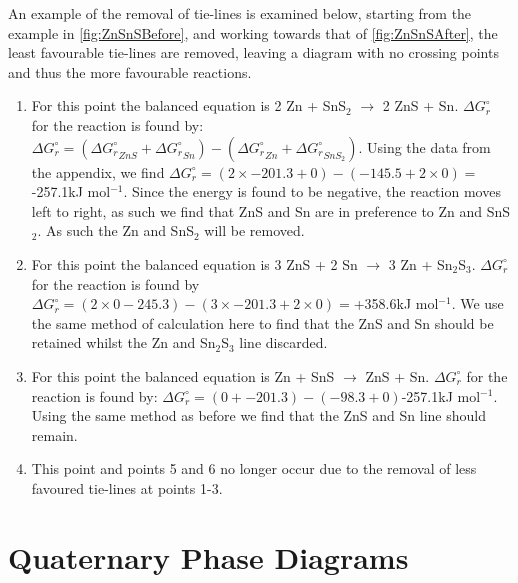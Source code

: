 An example of the removal of tie-lines is examined below, starting from the example in \ref{fig:ZnSnSBefore}, and working towards that of \ref{fig:ZnSnSAfter}, the least favourable tie-lines are removed, leaving a diagram with no crossing points and thus the more favourable reactions.

\begin{enumerate}
\item For this point the balanced equation is 2 Zn + SnS$_2$ $\rightarrow$ 2 ZnS + Sn. $\Delta G_{r}^{\circ}$ for the reaction is found by: $\Delta G_{r}^{\circ} = (\Delta {G_{r}^{\circ}}_{ZnS} + \Delta {G_{r}^{\circ}}_{Sn}) - (\Delta {G_{r}^{\circ}}_{Zn} + \Delta {G_{r}^{\circ}}_{SnS_2})$. Using the data from the appendix, we find $\Delta G_{r}^{\circ}=(2\times-201.3 + 0)-(-145.5+2\times0)=$-257.1kJ mol$^{-1}$. Since the energy is found to be negative, the reaction moves left to right, as such we find that ZnS and Sn are in preference to Zn and SnS$_2$. As such the Zn and SnS$_2$ will be removed.

\item For this point the balanced equation is 3 ZnS + 2 Sn $\rightarrow$ 3 Zn + Sn$_2$S$_3$. $\Delta G_{r}^{\circ}$ for the reaction is found by $\Delta G_{r}^{\circ}=(2\times0 -245.3)-(3\times-201.3+2\times0)=$+358.6kJ mol$^{-1}$. We use the same method of calculation here to find that the ZnS and Sn should be retained whilst the Zn and Sn$_2$S$_3$ line discarded. 

\item For this point the balanced equation is Zn + SnS $\rightarrow$ ZnS + Sn. $\Delta G_{r}^{\circ}$ for the reaction is found by: $\Delta G_{r}^{\circ}=(0+ -201.3)-(-98.3+0)$-257.1kJ mol$^{-1}$. Using the same method as before we find that the ZnS and Sn line should remain.
\item This point and points 5 and 6 no longer occur due to the removal of less favoured tie-lines at points 1-3. 
\end{enumerate}


\section{Quaternary Phase Diagrams}

